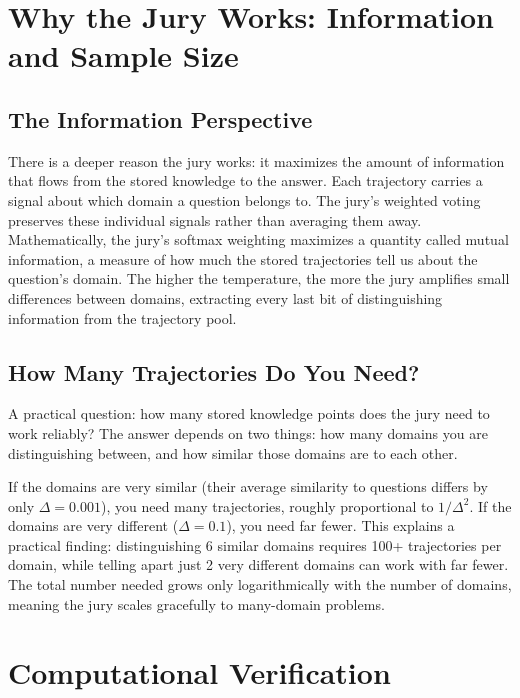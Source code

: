 \documentclass[11pt]{article}
\begin{document}
\section{Why the Jury Works: Information and Sample Size}

\subsection{The Information Perspective}

There is a deeper reason the jury works: it maximizes the amount of
information that flows from the stored knowledge to the answer. Each
trajectory carries a signal about which domain a question belongs to.
The jury's weighted voting preserves these individual signals rather than
averaging them away. Mathematically, the jury's softmax weighting maximizes
a quantity called mutual information, a measure of how much the
stored trajectories tell us about the question's domain. The higher the
temperature, the more the jury amplifies small differences between domains,
extracting every last bit of distinguishing information from the trajectory
pool.

\subsection{How Many Trajectories Do You Need?}

A practical question: how many stored knowledge points does the jury need to
work reliably? The answer depends on two things: how many domains you are
distinguishing between, and how similar those domains are to each other.

If the domains are very similar (their average similarity to questions differs
by only $\Delta = 0.001$), you need many trajectories, roughly proportional
to $1/\Delta^2$. If the domains are very different ($\Delta = 0.1$), you need
far fewer. This explains a practical finding: distinguishing 6 similar domains
requires 100+ trajectories per domain, while telling apart just 2 very
different domains can work with far fewer. The total number needed grows only
logarithmically with the number of domains, meaning the jury scales gracefully
to many-domain problems.


\section{Computational Verification}
\end{document}
